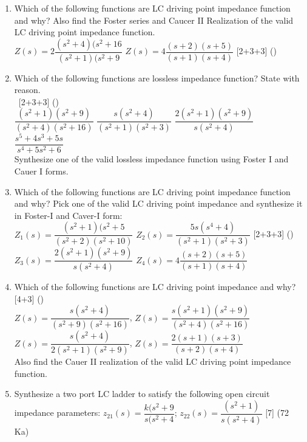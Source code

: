 \documentclass[12pt]{article}
\newcommand{\enter}{\\\textcolor{white}{1}}
\begin{document}
\begin{enumerate}
				\item Which of the following functions are LC driving point impedance function and why? Also find the Foster series and Caucer II Realization of the valid LC driving point impedance function.\\
				$Z(s) = 2\dfrac{(s^2+4)(s^2+16}{(s^2+1)(s^2+9}$ \hspace{2cm}
				$Z(s) = 4\dfrac{(s+2)(s+5)}{(s+1)(s+4)}$ \hfill [2+3+3] ()
				
				\item Which of the following functions are lossless impedance function? State with reason. 
				\enter\hfill [2+3+3] ()\\
				$\dfrac{(s^2+1)(s^2+9)}{(s^2+4)(s^2+16)}$ \hspace{1cm}
				$\dfrac{s(s^2+4)}{(s^2+1)(s^2+3)}$ \hspace{1cm}
				$\dfrac{2(s^2+1)(s^2+9)}{s(s^2+4)}$ \hspace{1cm}
				$\dfrac{s^5+4s^3+5s}{s^4+5s^2+6}$\\
				Synthesize one of the valid lossless impedance function using Foster I and Cauer I forms.	
				
				\item Which of the following functions are LC driving point impedance function and why? Pick one of the valid LC driving point impedance and synthesize it in Foster-I and Caver-I form:\\
				$Z_1(s) = \dfrac{(s^2+1)(s^2+5}{(s^2+2)(s^2+10)}$ \hspace{2cm}
				$Z_2(s) = \dfrac{5s(s^4+4)}{(s^2+1)(s^2+3)}$ \hfill [2+3+3] ()\\
				$Z_3(s) = \dfrac{2(s^2+1)(s^2+9)}{s(s^2+4)}$ \hspace{2cm}
				$Z_4(s) = 4\dfrac{(s+2)(s+5)}{(s+1)(s+4)}$
				
				\item Which of the following functions are LC driving point impedance and why? \hfill [4+3] ()\\
				$Z(s) = \dfrac{s(s^2+4)}{(s^2+9)(s^2+16)}$, \hspace{2cm}
				$Z(s) = \dfrac{s(s^2+1)(s^2+9)}{(s^2+4)(s^2+16)}$ \\
				$Z(s) = \dfrac{s(s^2+4)}{2(s^2+1)(s^2+9)}$, \hspace{2cm}
				$Z(s) = \dfrac{2(s+1)(s+3)}{(s+2)(s+4)}$\\
				Also find the Cauer II realization of the valid LC driving point impedance function.
				
				\item Synthesize a two port LC ladder to satisfy the following open circuit impedance parameters: $z_{21}(s) = \dfrac{k(s^2+9}{s(s^2+4}$; $z_{22}(s) = \dfrac{(s^2+1)}{s(s^2+4)}$ \hfill [7] (72 Ka)
			\end{enumerate}
\end{document}
